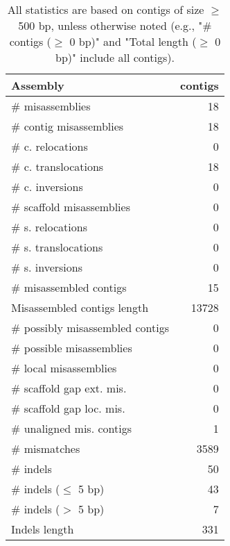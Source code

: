 \documentclass[12pt,a4paper]{article}
\begin{document}
\begin{table}[ht]
\begin{center}
\caption{All statistics are based on contigs of size $\geq$ 500 bp, unless otherwise noted (e.g., "\# contigs ($\geq$ 0 bp)" and "Total length ($\geq$ 0 bp)" include all contigs).}
\begin{tabular}{|l*{1}{|r}|}
\hline
Assembly & contigs \\ \hline
\# misassemblies & 18 \\ \hline
\hspace{2mm}\# contig misassemblies & 18 \\ \hline
\hspace{5mm}\# c. relocations & 0 \\ \hline
\hspace{5mm}\# c. translocations & 18 \\ \hline
\hspace{5mm}\# c. inversions & 0 \\ \hline
\hspace{2mm}\# scaffold misassemblies & 0 \\ \hline
\hspace{5mm}\# s. relocations & 0 \\ \hline
\hspace{5mm}\# s. translocations & 0 \\ \hline
\hspace{5mm}\# s. inversions & 0 \\ \hline
\# misassembled contigs & 15 \\ \hline
Misassembled contigs length & 13728 \\ \hline
\# possibly misassembled contigs & 0 \\ \hline
\hspace{5mm}\# possible misassemblies & 0 \\ \hline
\# local misassemblies & 0 \\ \hline
\# scaffold gap ext. mis. & 0 \\ \hline
\# scaffold gap loc. mis. & 0 \\ \hline
\# unaligned mis. contigs & 1 \\ \hline
\# mismatches & 3589 \\ \hline
\# indels & 50 \\ \hline
\hspace{5mm}\# indels ($\leq$ 5 bp) & 43 \\ \hline
\hspace{5mm}\# indels ($>$ 5 bp) & 7 \\ \hline
Indels length & 331 \\ \hline
\end{tabular}
\end{center}
\end{table}
\end{document}
